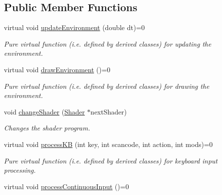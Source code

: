 \subsection*{Public Member Functions}
\begin{DoxyCompactItemize}
\item 
virtual void \hyperlink{class_environment_afbc95329581e994ed49a678c814657ea}{update\+Environment} (double dt)=0
\begin{DoxyCompactList}\small\item\em Pure virtual function (i.\+e. defined by derived classes) for updating the environment. \end{DoxyCompactList}\item 
virtual void \hyperlink{class_environment_abcb85d008742da90125199da254c2c02}{draw\+Environment} ()=0\hypertarget{class_environment_abcb85d008742da90125199da254c2c02}{}\label{class_environment_abcb85d008742da90125199da254c2c02}

\begin{DoxyCompactList}\small\item\em Pure virtual function (i.\+e. defined by derived classes) for drawing the environment. \end{DoxyCompactList}\item 
void \hyperlink{class_environment_ac3b35b4c49e51075063e4dbed67845fb}{change\+Shader} (\hyperlink{class_shader}{Shader} $\ast$next\+Shader)
\begin{DoxyCompactList}\small\item\em Changes the shader program. \end{DoxyCompactList}\item 
virtual void \hyperlink{class_environment_a3a105533fb7592615f6b4321aafc5545}{process\+KB} (int key, int scancode, int action, int mods)=0
\begin{DoxyCompactList}\small\item\em Pure virtual function (i.\+e. defined by derived classes) for keyboard input processing. \end{DoxyCompactList}\item 
virtual void \hyperlink{class_environment_ac8157c702f012ecbdf42fc868d5164a8}{process\+Continuous\+Input} ()=0\hypertarget{class_environment_ac8157c702f012ecbdf42fc868d5164a8}{}\label{class_environment_ac8157c702f012ecbdf42fc868d5164a8}


\end{DoxyCompactItemize}

